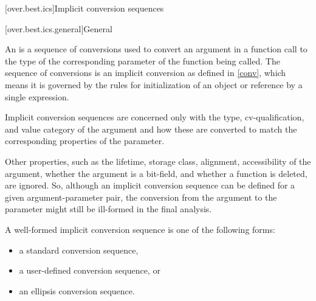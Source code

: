 [over.best.ics]{Implicit conversion sequences}%

[over.best.ics.general]{General}%

\pnum
An 
is a sequence of conversions used
to convert an argument in a function call to the type of the
corresponding parameter of the function being called.
The
sequence of conversions is an implicit conversion as defined in
\ref{conv}, which means it is governed by the rules for
initialization of an object or reference by a single
expression.

\pnum
Implicit conversion sequences are concerned only with the type,
cv-qualification, and value category of the argument and how these
are converted to match the corresponding properties of the
parameter.
\begin{note}
Other properties, such as the lifetime, storage class,
alignment, accessibility of the argument, whether the argument is a bit-field,
and whether a function is deleted, are ignored.
So, although an implicit
conversion sequence can be defined for a given argument-parameter
pair, the conversion from the argument to the parameter might still
be ill-formed in the final analysis.
\end{note}

\pnum
A
well-formed implicit conversion
sequence is one of the following forms:
\begin{itemize}
\item
a standard conversion sequence,
\item
a user-defined conversion sequence, or
\item
an ellipsis conversion sequence.
\end{itemize}

